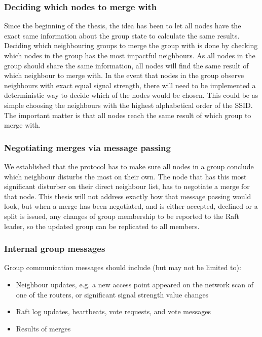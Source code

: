 \subsubsection{Deciding which nodes to merge with}
Since the beginning of the thesis, the idea has been to let all nodes have the exact same information about the group state to calculate the same results. Deciding
which neighbouring groups to merge the group with is done by checking which nodes in the group has the most impactful neighbours. As all nodes in the group should share
the same information, all nodes will find the same result of which neighbour to merge with.
In the event that nodes in the group observe neighbours with exact equal signal strength, there will need to be implemented a deterministic way to decide which of the nodes would be chosen.
This could be as simple choosing the neighbours with the highest alphabetical order of the SSID. The important matter is that all nodes reach the same result of which group to merge with. 

\subsubsection{Negotiating merges via message passing}
We established that the protocol has to make sure all nodes in a group conclude which neighbour disturbs the most on their own.
The node that has this most significant disturber on their direct neighbour list, has to negotiate a merge for that node. 
This thesis will not address exactly how that message passing would look, but when a merge has been negotiated, and is either accepted, declined or a split is issued,
any changes of group membership to be reported to the Raft leader, so the updated group can be replicated to all members. 

\subsubsection{Internal group messages}
Group communication messages should include (but may not be limited to):
			\begin{itemize}
				\item Neighbour updates, e.g. a new access point appeared on the network scan of one of the routers, or significant signal strength value changes
				\item Raft log updates, heartbeats, vote requests, and vote messages
				\item Results of merges 
			\end{itemize}
				
